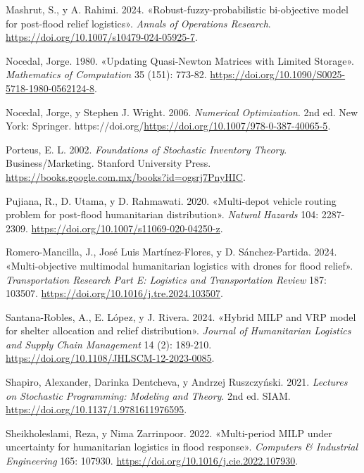 \documentclass[
  spanish,
  us-letterpaper,
  DIV=11,
  numbers=noendperiod]{scrreprt}
\newlength{\cslhangindent}
\newenvironment{CSLReferences}[2] %
 {\begin{list}{}{%
  \setlength{\itemindent}{0pt}
  \setlength{\leftmargin}{0pt}
  \setlength{\parsep}{0pt}
  \ifodd #1
   \setlength{\leftmargin}{\cslhangindent}
   \setlength{\itemindent}{-1\cslhangindent}
  \fi
  \setlength{\itemsep}{#2\baselineskip}}}
 {\end{list}}
\numberwithin{equation}{section}
\begin{document}
\begin{CSLReferences}{1}{0}
Mashrut, S., y A. Rahimi. 2024. {«Robust-fuzzy-probabilistic
bi-objective model for post-flood relief logistics»}. \emph{Annals of
Operations Research}. \url{https://doi.org/10.1007/s10479-024-05925-7}.

Nocedal, Jorge. 1980. {«Updating Quasi-Newton Matrices with Limited
Storage»}. \emph{Mathematics of Computation} 35 (151): 773-82.
\url{https://doi.org/10.1090/S0025-5718-1980-0562124-8}.

Nocedal, Jorge, y Stephen J. Wright. 2006. \emph{Numerical
Optimization}. 2nd ed. New York: Springer.
https://doi.org/\url{https://doi.org/10.1007/978-0-387-40065-5}.

Porteus, E. L. 2002. \emph{Foundations of Stochastic Inventory Theory}.
Business/Marketing. Stanford University Press.
\url{https://books.google.com.mx/books?id=ogsrj7PnyHIC}.

Pujiana, R., D. Utama, y D. Rahmawati. 2020. {«Multi-depot vehicle
routing problem for post-flood humanitarian distribution»}.
\emph{Natural Hazards} 104: 2287-2309.
\url{https://doi.org/10.1007/s11069-020-04250-z}.

Romero-Mancilla, J., José Luis Martínez-Flores, y D. Sánchez-Partida.
2024. {«Multi-objective multimodal humanitarian logistics with drones
for flood relief»}. \emph{Transportation Research Part E: Logistics and
Transportation Review} 187: 103507.
\url{https://doi.org/10.1016/j.tre.2024.103507}.

Santana-Robles, A., E. López, y J. Rivera. 2024. {«Hybrid MILP and VRP
model for shelter allocation and relief distribution»}. \emph{Journal of
Humanitarian Logistics and Supply Chain Management} 14 (2): 189-210.
\url{https://doi.org/10.1108/JHLSCM-12-2023-0085}.

Shapiro, Alexander, Darinka Dentcheva, y Andrzej Ruszczyński. 2021.
\emph{Lectures on Stochastic Programming: Modeling and Theory}. 2nd ed.
SIAM. \url{https://doi.org/10.1137/1.9781611976595}.

Sheikholeslami, Reza, y Nima Zarrinpoor. 2022. {«Multi-period MILP under
uncertainty for humanitarian logistics in flood response»}.
\emph{Computers \& Industrial Engineering} 165: 107930.
\url{https://doi.org/10.1016/j.cie.2022.107930}.


\end{CSLReferences}
\end{document}
